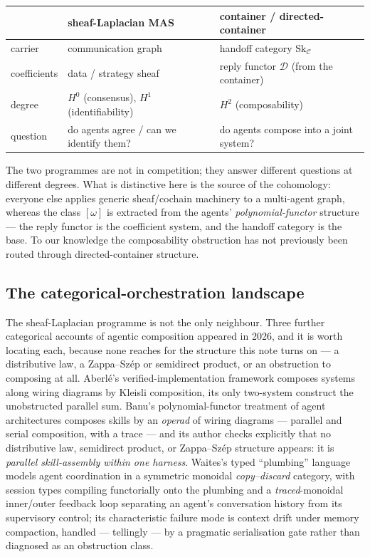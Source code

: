\documentclass[11pt]{amsart}
\theoremstyle{definition}
\theoremstyle{remark}
\newcommand{\C}{\mathcal{C}}
\newcommand{\Sk}{\mathrm{Sk}}
\newcommand{\dir}{\mathcal{D}}
\begin{document}
\begin{center}
\renewcommand{\arraystretch}{1.3}
\begin{tabular}{@{}lll@{}}
\toprule
 & sheaf-Laplacian MAS & container / directed-container \\
\midrule
carrier & communication graph & handoff category $\Sk_\C$ \\
coefficients & data / strategy sheaf & reply functor $\dir$ (from the container) \\
degree & $H^0$ (consensus), $H^1$ (identifiability) & $H^2$ (composability) \\
question & do agents agree / can we identify them? & do agents compose into a joint system? \\
\bottomrule
\end{tabular}
\end{center}

The two programmes are not in competition; they answer different questions at different
degrees. What is distinctive here is the source of the cohomology: everyone else applies
generic sheaf/cochain machinery to a multi-agent graph, whereas the class $[\omega]$ is
extracted from the agents' \emph{polynomial-functor} structure --- the reply functor is the
coefficient system, and the handoff category is the base. To our knowledge the composability
obstruction has not previously been routed through directed-container structure.

\subsection*{The categorical-orchestration landscape}
The sheaf-Laplacian programme is not the only neighbour. Three further categorical accounts of
agentic composition appeared in 2026, and it is worth locating each, because none reaches for the
structure this note turns on --- a distributive law, a Zappa--Sz\'ep or semidirect product, or an
obstruction to composing at all. Aberl\'e's verified-implementation framework \cite{aberle} composes
systems along wiring diagrams by Kleisli composition, its only two-system construct the unobstructed
parallel sum. Banu's polynomial-functor treatment of agent architectures \cite{banu} composes skills
by an \emph{operad} of wiring diagrams --- parallel and serial composition, with a trace --- and its
author checks explicitly that no distributive law, semidirect product, or Zappa--Sz\'ep structure
appears: it is \emph{parallel skill-assembly within one harness}. Waites's typed ``plumbing''
language \cite{waites} models agent coordination in a symmetric monoidal \emph{copy--discard}
category, with session types compiling functorially onto the plumbing and a \emph{traced}-monoidal
inner/outer feedback loop separating an agent's conversation history from its supervisory control;
its characteristic failure mode is context drift under memory compaction, handled --- tellingly ---
by a pragmatic serialisation gate rather than diagnosed as an obstruction class.
\end{document}
